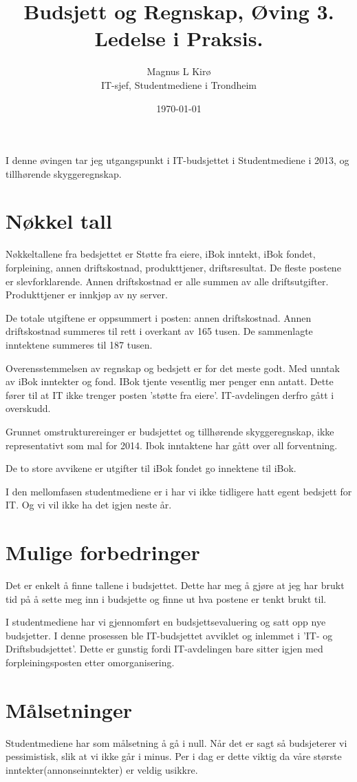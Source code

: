 \documentclass[12pt, a4paper]{article}
\title{
	Budsjett og Regnskap, Øving 3. Ledelse i Praksis.
}
\author{
	Magnus L Kirø \\
	IT-sjef, Studentmediene i Trondheim %
}
\date{\today}
\begin{document}
\maketitle
{}

I denne øvingen tar jeg utgangspunkt i IT-budsjettet i Studentmediene i 2013,
og tillhørende skyggeregnskap. 

\section{Nøkkel tall}
Nøkkeltallene fra bedsjettet er Støtte fra eiere, iBok inntekt, iBok fondet, forpleining,
annen driftskostnad, produkttjener, driftsresultat. De fleste postene er slevforklarende.
Annen driftskostnad er alle summen av alle driftsutgifter. Produkttjener er
innkjøp av ny server. 

De totale utgiftene er oppsummert i posten: annen driftskostnad. Annen
driftskostnad summeres til rett i overkant av 165 tusen. De sammenlagte
inntektene summeres til 187 tusen. 

Overensstemmelsen av regnskap og bedsjett er for det meste godt. Med unntak av
iBok inntekter og fond. IBok tjente vesentlig mer penger enn antatt. Dette
fører til at IT ikke trenger posten 'støtte fra eiere'. IT-avdelingen derfro
gått i overskudd.  

Grunnet omstrukturereinger er budsjettet og tillhørende skyggeregnskap, ikke
representativt som mal for 2014. 
Ibok inntaktene har gått over all forventning. 

De to store avvikene er utgifter til iBok fondet go innektene til iBok. 

I den mellomfasen studentmediene er i har vi ikke tidligere hatt egent bedsjett
for IT. Og vi vil ikke ha det igjen neste år. 

\section{Mulige forbedringer}
Det er enkelt å finne tallene i budsjettet. Dette har meg å gjøre at jeg har
brukt tid på å sette meg inn i budsjette og finne ut hva postene er tenkt brukt
til. 

I studentmediene har vi gjennomført en budsjettsevaluering og satt opp nye
budsjetter. I denne prosessen ble IT-budsjettet avviklet og inlemmet i 'IT- og
Driftsbudsjettet'. Dette er gunstig fordi IT-avdelingen bare sitter igjen med
forpleiningsposten etter omorganisering. 

\section{Målsetninger}
Studentmediene har som målsetning å gå i null. Når det er sagt så budsjeterer
vi pessimistisk, slik at vi ikke går i minus. Per i dag er dette viktig da våre
største inntekter(annonseinntekter) er veldig usikkre.
\end{document}

